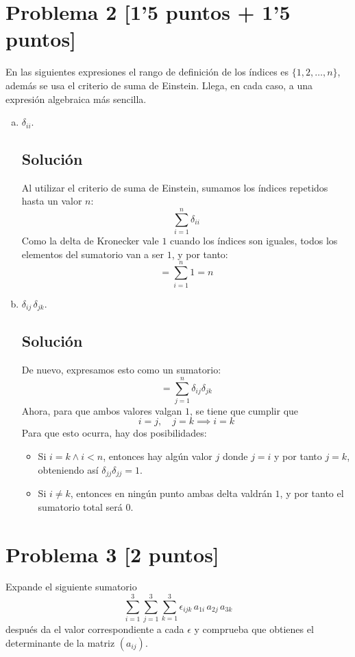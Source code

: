 \documentclass[12pt,reqno]{article}
\begin{document}
	\section*{Problema 2 [1'5 puntos + 1'5 puntos]}
	En las siguientes expresiones el rango de definición de los índices es $\{1,2,\ldots,n\}$, además se usa el criterio de suma de Einstein. Llega, en cada caso, a una expresión algebraica más sencilla.
	\begin{enumerate}[(a)]
		\item $\delta_{ii}$.
		\subsection*{Solución}
		Al utilizar el criterio de suma de Einstein, sumamos los índices
		repetidos hasta un valor $n$:
		\[
			\sum_{i=1}^{n} \delta_{ii}
		\]
		Como la delta de Kronecker vale $1$ cuando los índices son iguales,
		todos los elementos del sumatorio van a ser $1$, y por tanto:
		\[
			= \sum_{i=1}^{n}1 = n
		\]
		\item $\delta_{ij}\,\delta_{jk}$.
		\subsection*{Solución}
		De nuevo, expresamos esto como un sumatorio:
		\[
			= \sum_{j=1}^{n}\delta_{ij}\delta_{jk}
		\]
		Ahora, para que ambos valores valgan $1$, se tiene que cumplir que
		\[
			i=j, \quad j=k \implies i=k
		\]
		Para que esto ocurra, hay dos posibilidades:
		\begin{itemize}
			\item Si $i = k \wedge i < n$, entonces hay algún valor $j$ 
				donde $j=i$ y por tanto $j = k$, obteniendo así
				$\delta_{jj}\delta_{jj}=1$.
			\item Si $i\neq k$, entonces en ningún punto ambas delta valdrán
				$1$, y por tanto el sumatorio total será $0$.  
		\end{itemize}
	\end{enumerate}
	
	\section*{Problema 3 [2 puntos]}
	Expande el siguiente sumatorio
	\begin{equation*}
		\sum_{i=1}^{3}\sum_{j=1}^{3}\sum_{k=1}^{3}\epsilon_{ijk}\,a_{1i}\,a_{2j}\,a_{3k}
	\end{equation*}
	después da el valor correspondiente a cada $\epsilon$ y comprueba que obtienes el determinante de la matriz $(a_{ij})$.
\end{document}
